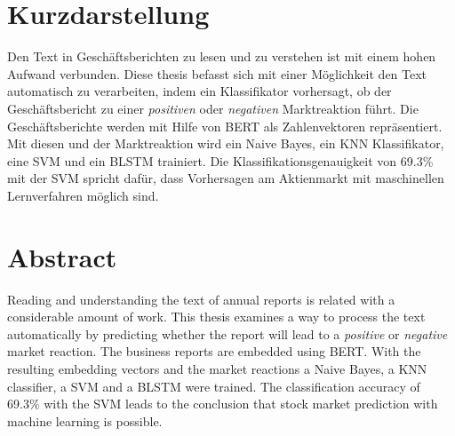 \thispagestyle{empty}
\section*{Kurzdarstellung}
\label{sec:kurzdarstellung}

Den Text in Geschäftsberichten zu lesen und zu verstehen ist mit einem hohen Aufwand verbunden.
Diese thesis befasst sich mit einer Möglichkeit den Text automatisch zu verarbeiten, indem ein Klassifikator vorhersagt, ob der Geschäftsbericht zu einer \textit{positiven} oder \textit{negativen} Marktreaktion führt.
Die Geschäftsberichte werden mit Hilfe von \ac{BERT} als Zahlenvektoren repräsentiert.
Mit diesen und der Marktreaktion wird ein Naive Bayes, ein \acs{KNN} Klassifikator, eine \acs{SVM} und ein \acs{BLSTM} trainiert.
Die Klassifikationsgenauigkeit von 69.3\% mit der \acs{SVM} spricht dafür, dass Vorhersagen am Aktienmarkt mit maschinellen Lernverfahren möglich sind.


\section*{Abstract}
\label{sec:abstract}

Reading and understanding the text of annual reports is related with a considerable amount of work.
This thesis examines a way to process the text automatically by predicting whether the report will lead to a \textit{positive} or \textit{negative} market reaction.
The business reports are embedded using \ac{BERT}.
With the resulting embedding vectors and the market reactions a Naive Bayes, a \acs{KNN} classifier, a \acs{SVM} and a \acs{BLSTM} were trained.
The classification accuracy of 69.3\% with the \acs{SVM} leads to the conclusion that stock market prediction with machine learning is possible.